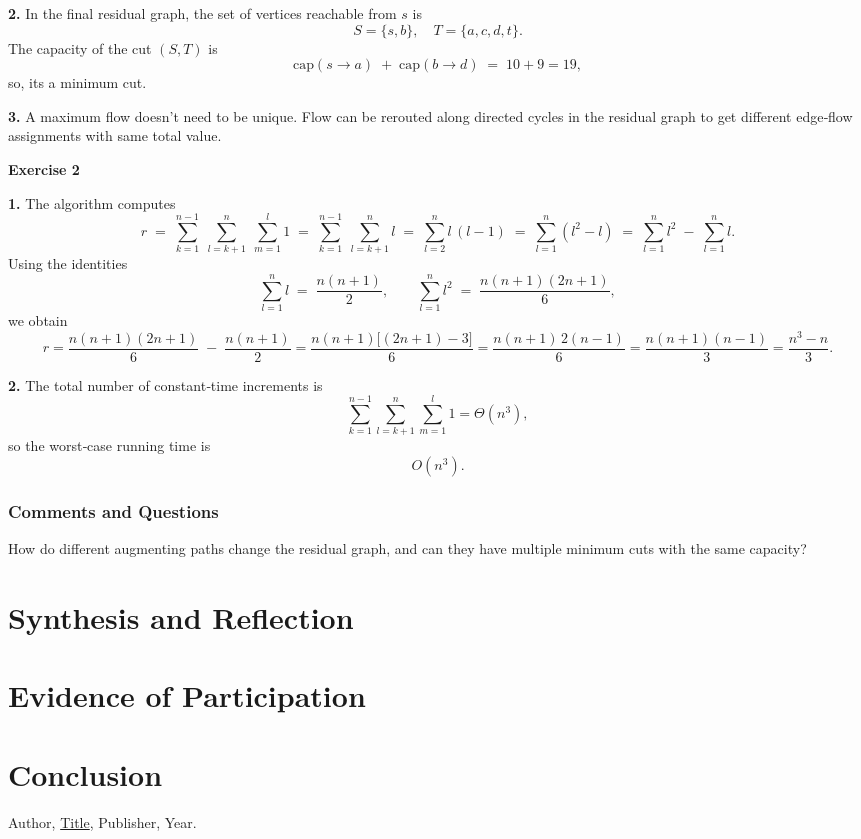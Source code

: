 \documentclass{article}
\theoremstyle{theorem}
\theoremstyle{definition}
\theoremstyle{remark}
\begin{document}
\textbf{2.} In the final residual graph, the set of vertices reachable from $s$ is
\[
S=\{s,b\},\quad T=\{a,c,d,t\}.
\]
The capacity of the cut $(S,T)$ is
\[
\mathrm{cap}(s\to a)\;+\;\mathrm{cap}(b\to d)
\;=\;10 + 9 = 19,
\]
so, its a minimum cut.

\textbf{3.} A maximum flow doesn't need to be unique. Flow can be rerouted along directed cycles in the residual graph to get different edge‐flow assignments with same total value.

\textbf{Exercise 2}

\textbf{1.} The algorithm computes
\[
r \;=\;\sum_{k=1}^{n-1}\;\sum_{l=k+1}^{n}\;\sum_{m=1}^{l}1
\;=\;\sum_{k=1}^{n-1}\;\sum_{l=k+1}^{n}l
\;=\;\sum_{l=2}^{n}l\,(l-1)
\;=\;\sum_{l=1}^{n}(l^2 - l)
\;=\;\sum_{l=1}^{n}l^2 \;-\;\sum_{l=1}^{n}l.
\]
Using the identities
\[
\sum_{l=1}^n l \;=\;\frac{n(n+1)}2,
\qquad
\sum_{l=1}^n l^2 \;=\;\frac{n(n+1)(2n+1)}6,
\]
we obtain
\[
r
=\frac{n(n+1)(2n+1)}6 \;-\;\frac{n(n+1)}2
=\frac{n(n+1)\bigl[(2n+1)-3\bigr]}6
=\frac{n(n+1)\,2(n-1)}6
=\frac{n(n+1)(n-1)}3
=\frac{n^3-n}{3}.
\]

\textbf{2.} The total number of constant‐time increments is
\[
\sum_{k=1}^{n-1}\sum_{l=k+1}^{n}\sum_{m=1}^{l}1
=\Theta(n^3),
\]
so the worst‐case running time is
\[
O(n^3).
\]

\subsubsection*{Comments and Questions}

How do different augmenting paths change the residual graph, and can they have multiple minimum cuts with the same capacity?

\section{Synthesis and Reflection}

\section{Evidence of Participation}

\section{Conclusion}\label{conclusion}

\begin{thebibliography}{99}
 Author, \href{https://en.wikipedia.org/wiki/LaTeX}{Title}, Publisher, Year.
\end{thebibliography}
\end{document}
